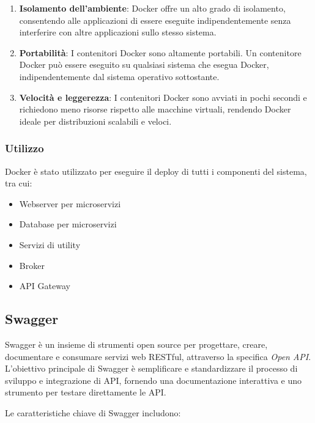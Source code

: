 \begin{enumerate}
    \item \textbf{Isolamento dell'ambiente}: Docker offre un alto grado di isolamento, consentendo alle applicazioni di essere eseguite indipendentemente senza interferire con altre applicazioni sullo stesso sistema.

    \item \textbf{Portabilità}: I contenitori Docker sono altamente portabili. Un contenitore Docker può essere eseguito su qualsiasi sistema che esegua Docker, indipendentemente dal sistema operativo sottostante.

    \item \textbf{Velocità e leggerezza}: I contenitori Docker sono avviati in pochi secondi e richiedono meno risorse rispetto alle macchine virtuali, rendendo Docker ideale per distribuzioni scalabili e veloci.
\end{enumerate}

%
%
%
\subsubsection{Utilizzo}

Docker è stato utilizzato per eseguire il deploy di tutti i componenti del sistema, tra cui:

\begin{itemize}
    \item Webserver per microservizi
    \item Database per microservizi
    \item Servizi di utility
    \item Broker
    \item API Gateway
\end{itemize}

%
%
%
\subsection{Swagger}

Swagger è un insieme di strumenti open source per progettare, creare, documentare e consumare servizi web RESTful, attraverso la specifica \emph{Open API}.
%
L'obiettivo principale di Swagger è semplificare e standardizzare il processo di sviluppo e integrazione di API, fornendo una documentazione interattiva e uno strumento per testare direttamente le API.

Le caratteristiche chiave di Swagger includono:

